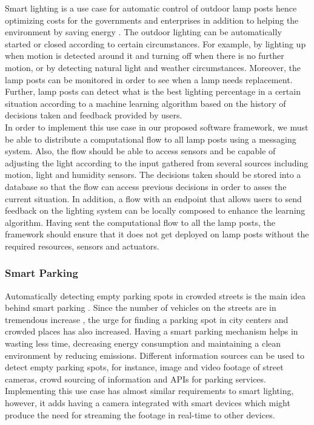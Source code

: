 Smart lighting is a use case for automatic control of outdoor lamp posts hence optimizing costs for the governments and enterprises in addition to helping the environment by saving energy \cite{6740844}. The outdoor lighting can be automatically started or closed according to certain circumstances. For example, by lighting up when motion is detected   around it and turning off when there is no further motion, or by detecting natural light  and weather circumstances. Moreover, the lamp posts can be monitored in order to see when a lamp needs replacement.  Further, lamp posts can detect what is the best lighting percentage in a certain situation according to a machine learning algorithm based on the history of decisions taken and feedback provided by users.\\

\noindent  In order to implement this use case in our proposed software framework, we must be able to distribute a computational flow to all lamp posts using a messaging system.  Also, the flow should be able to access sensors and be capable of adjusting the light according to the input gathered from several sources including motion, light and humidity sensors.  The decisions taken  should  be   stored into a database so that the flow can access  previous decisions in order to asses the current situation. In addition, a flow with an endpoint that  allows users to send feedback on the lighting system can be locally composed to enhance the learning algorithm. Having sent the computational flow to all the lamp posts, the framework should ensure that it does not get deployed on lamp posts without the  required resources, sensors and actuators. 

\subsubsection{Smart Parking}
Automatically detecting empty parking spots in crowded streets is the main idea behind smart parking \cite{4543911}. Since the number of vehicles on the streets are in tremendous increase \cite{cars}, the urge for finding a parking spot in city centers and crowded places has also increased. Having a smart parking mechanism helps in wasting less time, decreasing energy consumption and maintaining a clean environment by reducing emissions.  Different information sources can be used to  detect empty parking spots, for instance, image and video footage of street cameras, crowd sourcing of information and APIs for parking services. Implementing this use case has almost similar requirements to smart lighting, however, it adds having  a camera integrated with smart devices which might produce the need for streaming the footage in real-time to other devices.


